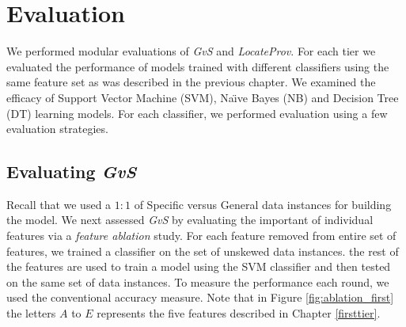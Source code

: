 \chapter{Evaluation}
\label{evaluation}
We performed modular evaluations of {\it GvS} and {\it LocateProv}. For each tier we evaluated the performance of models trained with different classifiers using the same feature set as was described in the previous chapter.  We examined the efficacy of Support Vector Machine (SVM), Na\"{\i}ve Bayes (NB) and Decision Tree (DT) learning models. 
For each classifier, we performed evaluation using a few evaluation strategies.

\section{Evaluating {\it GvS}}
\label{eval:first}
Recall that we used a $1:1$ of Specific versus General data instances for building the model.  
We next assessed {\it GvS} by evaluating the important of individual features via a {\it feature ablation} study. For each feature removed from entire set of features, we trained a classifier on the set of unskewed data instances. the rest of the features are used to train a model using the SVM classifier and then tested on the same set of data instances. To measure the performance each round, we used the conventional accuracy measure. Note that in Figure \ref{fig:ablation_first} the letters $A$ to $E$ represents the five features described in Chapter \ref{firsttier}.

